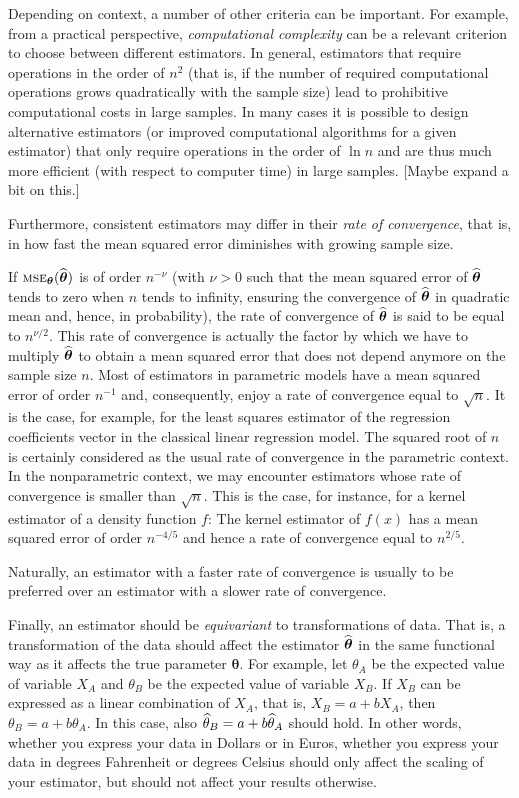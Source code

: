 Depending on context, a number of other criteria can be important. For example,
from a practical perspective, \emph{computational complexity} can be a relevant
criterion to choose between different estimators. In general, estimators that
require operations in the order of $n^2$ (that is, if the number of required
computational operations grows quadratically with the sample size) lead to
prohibitive computational costs in large samples. In many cases it is possible
to design alternative estimators (or improved computational algorithms
for a given estimator) that only require operations in the order of $\ln n$ and
are thus much more efficient (with respect to computer time) in large samples.
\alert{[Maybe expand a bit on this.]}

Furthermore, consistent estimators may differ in their \emph{rate of
convergence}, that is, in how fast the mean squared error diminishes with
growing sample size. 

If $\stsc{MSE}_{\boldsymbol\theta}(\sthat{\boldsymbol\theta})$ is of order $n^{-\nu}$ (with $\nu > 0$ such that the mean squared error of $\widehat{\boldsymbol\theta}$ tends to zero when $n$ tends to infinity, ensuring the convergence of $\widehat{\boldsymbol\theta}$ in quadratic mean and, hence, in probability), the rate of convergence of $\widehat{\boldsymbol\theta}$ is said to be equal to $n^{\nu/2}$. This rate of convergence is actually the factor by which we have to multiply $\widehat{\boldsymbol\theta}$ to obtain a mean squared error that does not depend anymore on the sample size $n$. Most of estimators in parametric models have a mean squared error of order $n^{-1}$ and, consequently, enjoy a rate of convergence equal to $\sqrt{n}$. It is the case, for example, for the least squares estimator of the regression coefficients vector in the classical linear regression model. The squared root of $n$ is certainly considered as the usual rate of convergence in the parametric context. In the nonparametric context, we may encounter estimators whose rate of convergence is smaller than $\sqrt{n}$. This is the case, for instance, for a kernel estimator of a density function $f$: The kernel estimator of $f(x)$ has a mean squared error of order $n^{-4/5}$ and hence a rate of convergence equal to $n^{2/5}$.

Naturally, an estimator with a faster rate of convergence is usually to be preferred over an estimator with a slower rate of convergence.

Finally, an estimator should be \emph{equivariant} to transformations of data.
That is, a transformation of the data should affect the estimator
$\widehat{\boldsymbol\theta}$ in the same functional way as it affects the true
parameter $\boldsymbol\theta$. For example, let $\theta_A$ be the expected
value of variable $X_A$ and $\theta_B$ be the expected value of variable $X_B$.
If $X_B$ can be expressed as a linear combination of $X_A$, that is, $X_B = a +
b X_A$, then $\theta_B = a + b \theta_A$. In this case, also
$\widehat{\theta}_B = a + b \widehat{\theta}_A$ should hold. In other words,
whether you express your data in Dollars or in Euros, whether you express your
data in degrees Fahrenheit or degrees Celsius should only affect the scaling of
your estimator, but should not affect your results otherwise.


